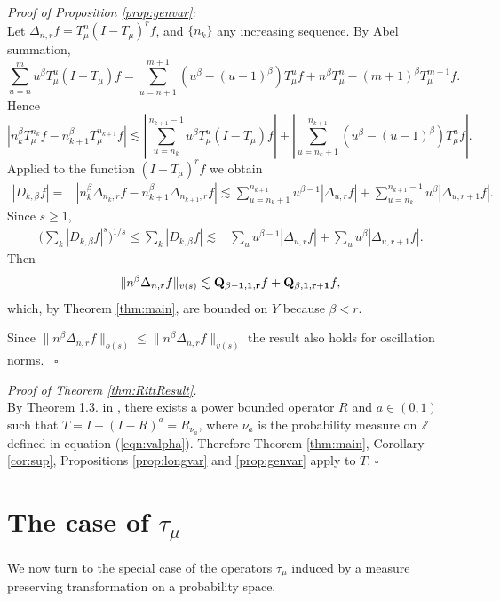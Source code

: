 \documentclass[11pt]{amsart}
\theoremstyle{definition}
\theoremstyle{remark}
\begin{document}
\bigskip
\noindent \textit{ Proof of Proposition \ref{prop:genvar}:} \\ %
Let $\Delta_{n,r}f=T_{\mu}^n(I-T_{\mu})^r f$, and 
$\{n_k\}$ any increasing sequence. 
By Abel summation,
\[\sum_{u=n}^m u^{\beta} T_{\mu}^u(I-T_{\mu})f=\sum_{u=n+1}^{m+1} (u^{\beta} - (u-1)^{\beta})T_{\mu}^uf + n^{\beta}T_{\mu}^n -(m+1)^{\beta} T_{\mu}^{m+1}f.\]
Hence 
\[\left| n_k^{\beta}T_{\mu}^{n_k}f -n_{k+1}^{\beta} T_{\mu}^{n_{k+1}}f \right| \lesssim  \left|   \sum_{u=n_k}^{n_{k+1}-1} u^{\beta} T_{\mu}^u(I-T_{\mu})f \right| +
\left| \sum_{u=n_k+1}^{n_{k+1}} (u^{\beta} - (u-1)^{\beta})T_{\mu}^uf  \right|.\]
Applied to the function $(I-T_{\mu})^r f$ we obtain
\begin{align}
|D_{k,\beta}f| = &  |n_k^{\beta} \Delta_{n_k,r} f - n_{k+1}^{\beta} \Delta_{n_{k+1},r}f | 
\lesssim   \sum_{u=n_k+1}^{n_{k+1}} u^{\beta-1} | \Delta_{u,r}f| +  \sum_{u=n_k}^{n_{k+1}-1}  u^{\beta} |\Delta_{u,r+1}f|. \label{eq:abel}
\end{align}
Since $s\ge 1$,
\begin{align*}
\Big( \sum_k |D_{k,\beta}f|^s \Big)^{1/s} \le  \sum_k |D_{k,\beta}f| \lesssim &  \sum_u  u^{\beta-1 } |\Delta_{u,r}f|  + \sum_u u^{\beta}  |\Delta_{u,r+1}f|.
\end{align*}
Then
\[ \lVert n^{\beta}\Delta_{n,r}f \rVert_{v(s)}  \lesssim {\bf Q_{\beta-1 ,1,r}}f + {\bf Q_{\beta ,1,r+1}}f,\]
which, by Theorem \ref{thm:main}, are bounded on $Y$ because $\beta<r$.

Since  $ \lVert n^{\beta} \Delta_{n,r}f \rVert_{o(s)}\le   \lVert n^{\beta} \Delta_{n,r}f \rVert_{v(s)}$ the result also holds for oscillation norms.
~\hfill$\square$
\medskip

\noindent \textit{ Proof of Theorem \ref{thm:RittResult}.}\\
By Theorem 1.3. in \cite{Dunn}, there exists  a power bounded %
operator $R$ and $a\in (0,1)$ 
such that 
$T=I-(I-R)^{a} = R_{\nu_{a}}$, where $\nu_{a}$ is the probability measure on $\mathbb Z$ defined in equation (\ref{eqn:valpha}).  
Therefore Theorem \ref{thm:main}, Corollary \ref{cor:sup}, Propositions \ref{prop:longvar}  and \ref{prop:genvar} apply to $T$.
\hfill$\square$


\section{The case of  $\tau_{\mu}$}%
We now turn to the special case of the operators $\tau_{\mu}$
induced by a measure preserving transformation on a probability space.
\end{document}
